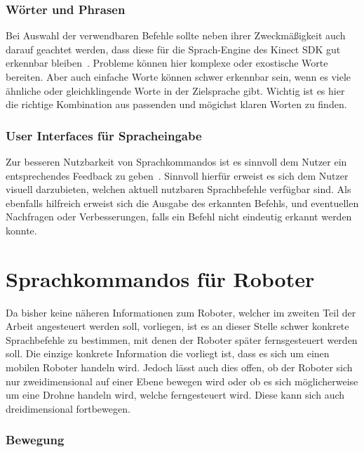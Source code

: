 \subsubsection{W\"orter und Phrasen}

Bei Auswahl der verwendbaren Befehle sollte neben ihrer Zweckm\"a\ss igkeit auch darauf geachtet werden, dass diese f\"ur die Sprach-Engine 
des Kinect SDK gut erkennbar bleiben~\cite{bib:kinect_hig}. Probleme k\"onnen hier komplexe oder exostische Worte bereiten. Aber auch einfache Worte k\"onnen schwer
erkennbar sein, wenn es viele \"ahnliche oder gleichklingende Worte in der Zielsprache gibt. Wichtig ist es hier die richtige Kombination aus
passenden und m\"ogichst klaren Worten zu finden. 

\subsubsection{User Interfaces f\"ur Spracheingabe}
Zur besseren Nutzbarkeit von Sprachkommandos ist es sinnvoll dem Nutzer ein entsprechendes Feedback zu geben~\cite{bib:kinect_hig}.
Sinnvoll hierf\"ur erweist es sich dem Nutzer visuell darzubieten, welchen aktuell nutzbaren Sprachbefehle verf\"ugbar sind.
Als ebenfalls hilfreich erweist sich die Ausgabe des erkannten Befehls, und eventuellen Nachfragen oder Verbesserungen, falls 
ein Befehl nicht eindeutig erkannt werden konnte.

\section{Sprachkommandos f\"ur Roboter}

Da bisher keine n\"aheren Informationen zum Roboter, welcher im zweiten Teil der Arbeit angesteuert werden soll, vorliegen, ist es an dieser Stelle schwer 
konkrete Sprachbefehle zu bestimmen, mit denen der Roboter sp\"ater fernsgesteuert werden soll.
Die einzige konkrete Information die vorliegt ist, dass es sich um einen mobilen Roboter handeln wird. 
Jedoch l\"asst auch dies offen, ob der Roboter sich nur zweidimensional auf einer Ebene bewegen wird oder ob es sich m\"oglicherweise um eine Drohne 
handeln wird, welche ferngesteuert wird. Diese kann sich auch dreidimensional fortbewegen.
\par\smallskip 

\subsubsection{Bewegung}

